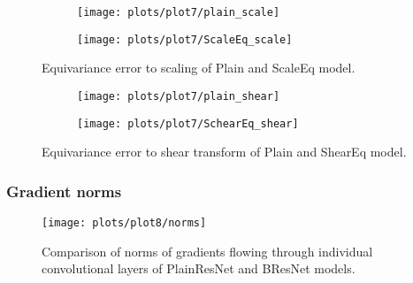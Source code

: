     \begin{figure}[h!]
        \centering
        \begin{subfigure}{0.4\textwidth}
            \texttt{[image: plots/plot7/plain\_scale]}
        \end{subfigure}
        \begin{subfigure}{0.4\textwidth}
            \texttt{[image: plots/plot7/ScaleEq\_scale]}
        \end{subfigure}
        \caption{Equivariance error to scaling of Plain and ScaleEq
        model.}
        \label{fig:plot7scale}
    \end{figure}


    \begin{figure}[h!]
        \centering
        \begin{subfigure}{0.4\textwidth}
            \texttt{[image: plots/plot7/plain\_shear]}
        \end{subfigure}
        \begin{subfigure}{0.4\textwidth}
            \texttt{[image: plots/plot7/SchearEq\_shear]}
        \end{subfigure}
        \caption{Equivariance error to shear transform of Plain and ShearEq
        model.}
        \label{fig:plot7shear}
    \end{figure}


    \subsubsection*{Gradient norms}
    \begin{figure}[h!]
        \centering
        \texttt{[image: plots/plot8/norms]}
        \caption{Comparison of norms of gradients flowing through individual
            convolutional layers of PlainResNet and BResNet models.}
        \label{fig:plot8}
    \end{figure}


